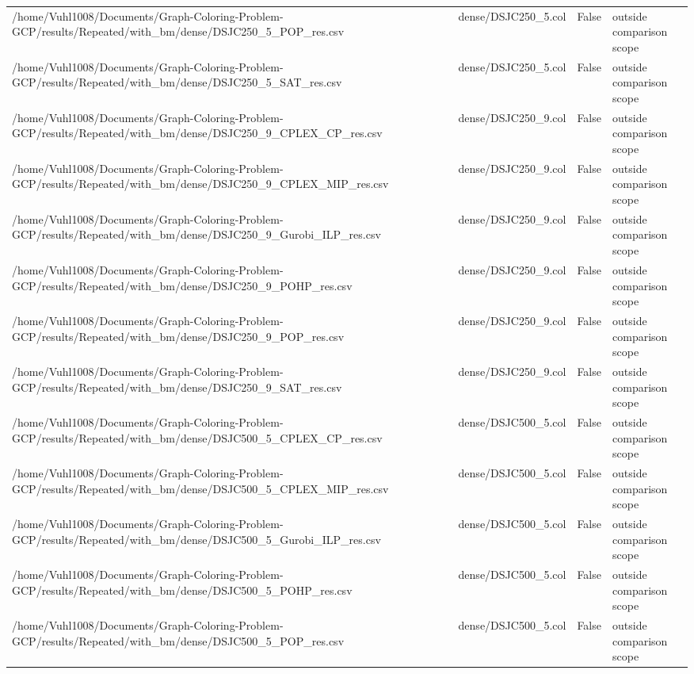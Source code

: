 \begin{table}[htbp]
\begin{tabular}{llll}
/home/Vuhl1008/Documents/Graph-Coloring-Problem-GCP/results/Repeated/with\_bm/dense/DSJC250\_5\_POP\_res.csv & dense/DSJC250\_5.col & False & outside comparison scope \\
/home/Vuhl1008/Documents/Graph-Coloring-Problem-GCP/results/Repeated/with\_bm/dense/DSJC250\_5\_SAT\_res.csv & dense/DSJC250\_5.col & False & outside comparison scope \\
/home/Vuhl1008/Documents/Graph-Coloring-Problem-GCP/results/Repeated/with\_bm/dense/DSJC250\_9\_CPLEX\_CP\_res.csv & dense/DSJC250\_9.col & False & outside comparison scope \\
/home/Vuhl1008/Documents/Graph-Coloring-Problem-GCP/results/Repeated/with\_bm/dense/DSJC250\_9\_CPLEX\_MIP\_res.csv & dense/DSJC250\_9.col & False & outside comparison scope \\
/home/Vuhl1008/Documents/Graph-Coloring-Problem-GCP/results/Repeated/with\_bm/dense/DSJC250\_9\_Gurobi\_ILP\_res.csv & dense/DSJC250\_9.col & False & outside comparison scope \\
/home/Vuhl1008/Documents/Graph-Coloring-Problem-GCP/results/Repeated/with\_bm/dense/DSJC250\_9\_POHP\_res.csv & dense/DSJC250\_9.col & False & outside comparison scope \\
/home/Vuhl1008/Documents/Graph-Coloring-Problem-GCP/results/Repeated/with\_bm/dense/DSJC250\_9\_POP\_res.csv & dense/DSJC250\_9.col & False & outside comparison scope \\
/home/Vuhl1008/Documents/Graph-Coloring-Problem-GCP/results/Repeated/with\_bm/dense/DSJC250\_9\_SAT\_res.csv & dense/DSJC250\_9.col & False & outside comparison scope \\
/home/Vuhl1008/Documents/Graph-Coloring-Problem-GCP/results/Repeated/with\_bm/dense/DSJC500\_5\_CPLEX\_CP\_res.csv & dense/DSJC500\_5.col & False & outside comparison scope \\
/home/Vuhl1008/Documents/Graph-Coloring-Problem-GCP/results/Repeated/with\_bm/dense/DSJC500\_5\_CPLEX\_MIP\_res.csv & dense/DSJC500\_5.col & False & outside comparison scope \\
/home/Vuhl1008/Documents/Graph-Coloring-Problem-GCP/results/Repeated/with\_bm/dense/DSJC500\_5\_Gurobi\_ILP\_res.csv & dense/DSJC500\_5.col & False & outside comparison scope \\
/home/Vuhl1008/Documents/Graph-Coloring-Problem-GCP/results/Repeated/with\_bm/dense/DSJC500\_5\_POHP\_res.csv & dense/DSJC500\_5.col & False & outside comparison scope \\
/home/Vuhl1008/Documents/Graph-Coloring-Problem-GCP/results/Repeated/with\_bm/dense/DSJC500\_5\_POP\_res.csv & dense/DSJC500\_5.col & False & outside comparison scope \\

\end{tabular}
\end{table}
